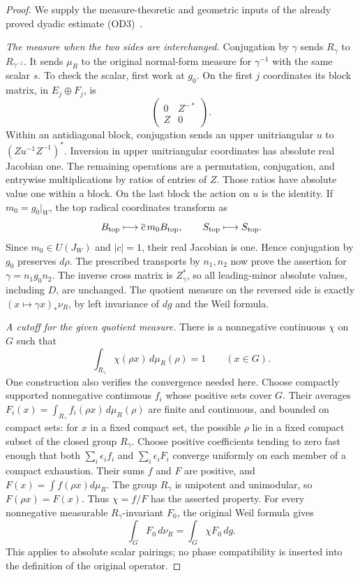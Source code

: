 \begin{proof}
We supply the measure-theoretic and geometric inputs of the
already proved dyadic estimate (OD3)~\cite{global-gram-degenerate-dyadic}.

\emph{The measure when the two sides are interchanged.}
Conjugation by $\gamma$ sends $R_\gamma$ to $R_{\gamma^{-1}}$.
It sends $\mu_R$ to the original normal-form measure for
$\gamma^{-1}$ with the same scalar $s$.  To check the scalar,
first work at $g_0$.  On the first $j$ coordinates its block
matrix, in $E_j\oplus F_j$, is
\[
                  \begin{pmatrix}0&Z^{-*}\\ Z&0\end{pmatrix}.
\]
Within an antidiagonal block, conjugation sends an upper
unitriangular $u$ to $(Zu^{-1}Z^{-1})^*$.  Inversion in
upper unitriangular coordinates has absolute real Jacobian one.
The remaining operations are a permutation, conjugation, and
entrywise multiplications by ratios of entries of $Z$.
Those ratios have absolute value one within a block.
On the last block the action on $u$ is the identity.
If $m_0=g_0|_W$, the top radical coordinates transform as
\[
                    B_{\rm top}\longmapsto
                         \overline c\,m_0B_{\rm top},
                  \qquad S_{\rm top}\longmapsto S_{\rm top}.
\]
Since $m_0\in U(J_W)$ and $|c|=1$, their real Jacobian is
one.  Hence conjugation by $g_0$ preserves $d\rho$.
The prescribed transports by $n_1,n_2$ now prove the assertion
for $\gamma=n_1g_0n_2$.
The inverse cross matrix is $Z_\gamma^*$, so all leading-minor
absolute values, including $D$, are unchanged.  The quotient
measure on the reversed side is exactly
$(x\mapsto\gamma x)_*\nu_R$, by left invariance of $dg$
and the Weil formula.

\emph{A cutoff for the given quotient measure.}
There is a nonnegative continuous $\chi$ on $G$ such that
\[
               \int_{R_\gamma}\chi(\rho x)\,d\mu_R(\rho)=1
                                              \qquad(x\in G).
\]
One construction also verifies the convergence needed here.
Choose compactly supported nonnegative continuous $f_i$ whose
positive sets cover $G$.  Their averages
$F_i(x)=\int_{R_\gamma}f_i(\rho x)\,d\mu_R(\rho)$ are finite
and continuous, and bounded on compact sets: for $x$ in a
fixed compact set, the possible $\rho$ lie in a fixed compact
subset of the closed group $R_\gamma$.
Choose positive coefficients tending to zero fast enough that
both $\sum_i\epsilon_i f_i$ and $\sum_i\epsilon_i F_i$
converge uniformly on each member of a compact exhaustion.
Their sums $f$ and $F$ are positive, and $F(x)=\int f(\rho x)d\mu_R$.
The group $R_\gamma$ is unipotent and unimodular, so
$F(\rho x)=F(x)$.  Thus $\chi=f/F$ has the asserted property.
For every nonnegative measurable $R_\gamma$-invariant $F_0$,
the original Weil formula gives
\begin{equation}\label{eq:degenerate-cutoff-identity}
                      \int_G F_0\,d\nu_R
                          =\int_G\chi F_0\,dg.
\end{equation}
This applies to absolute scalar pairings; no phase compatibility
is inserted into the definition of the original operator.


\end{proof}
